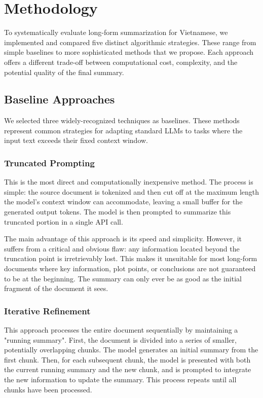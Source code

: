 \documentclass[11pt]{article}
\begin{document}

\section{Methodology}
\label{sec:methodology}

To systematically evaluate long-form summarization for Vietnamese, we implemented and compared five distinct algorithmic strategies. These range from simple baselines to more sophisticated methods that we propose. Each approach offers a different trade-off between computational cost, complexity, and the potential quality of the final summary.

\subsection{Baseline Approaches}
We selected three widely-recognized techniques as baselines. These methods represent common strategies for adapting standard LLMs to tasks where the input text exceeds their fixed context window.

\subsubsection{Truncated Prompting}
This is the most direct and computationally inexpensive method. The process is simple: the source document is tokenized and then cut off at the maximum length the model's context window can accommodate, leaving a small buffer for the generated output tokens. The model is then prompted to summarize this truncated portion in a single API call.

The main advantage of this approach is its speed and simplicity. However, it suffers from a critical and obvious flaw: any information located beyond the truncation point is irretrievably lost. This makes it unsuitable for most long-form documents where key information, plot points, or conclusions are not guaranteed to be at the beginning. The summary can only ever be as good as the initial fragment of the document it sees.

\subsubsection{Iterative Refinement}
This approach processes the entire document sequentially by maintaining a "running summary". First, the document is divided into a series of smaller, potentially overlapping chunks. The model generates an initial summary from the first chunk. Then, for each subsequent chunk, the model is presented with both the current running summary and the new chunk, and is prompted to integrate the new information to update the summary. This process repeats until all chunks have been processed.
\end{document}
